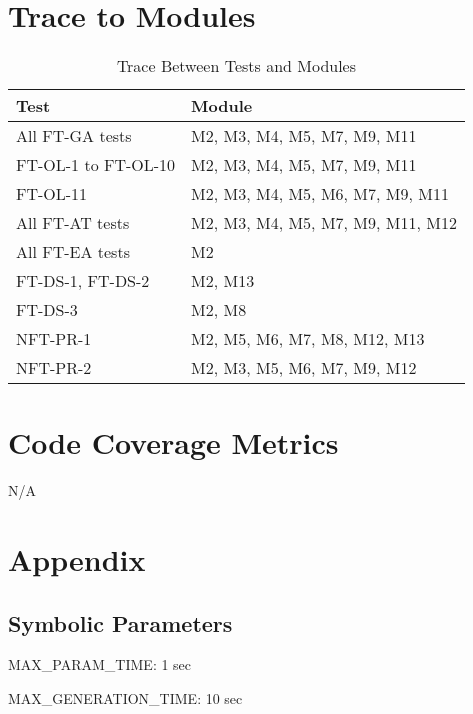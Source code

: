 \documentclass[12pt, titlepage]{article}
\begin{document}
\section{Trace to Modules}	

\begin{table}[H]
\centering
\begin{tabular}{p{} p{}}
\toprule
\textbf{Test} & \textbf{Module}\\
\midrule
All FT-GA tests & M2, M3, M4, M5, M7, M9, M11\\
FT-OL-1 to FT-OL-10 & M2, M3, M4, M5, M7, M9, M11\\
FT-OL-11 & M2, M3, M4, M5, M6, M7, M9, M11\\
All FT-AT tests & M2, M3, M4, M5, M7, M9, M11, M12\\
All FT-EA tests & M2\\
FT-DS-1, FT-DS-2 & M2, M13\\
FT-DS-3 & M2, M8\\
NFT-PR-1 & M2, M5, M6, M7, M8, M12, M13\\
NFT-PR-2 & M2, M3, M5, M6, M7, M9, M12\\
\bottomrule
\end{tabular}
\caption{Trace Between Tests and Modules}
\label{testsToReqs}
\end{table}

\section{Code Coverage Metrics}
N/A





\newpage

\section{Appendix}

\subsection{Symbolic Parameters}

MAX\_PARAM\_TIME: 1 sec

\noindent MAX\_GENERATION\_TIME: 10 sec
\end{document}
